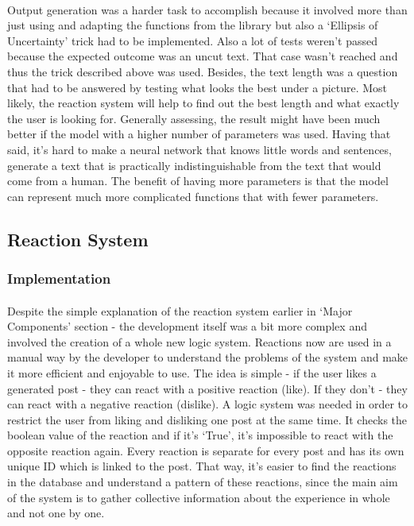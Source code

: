 \documentclass[12pt]{report}
\begin{document}
\paragraph{}
Output generation was a harder task to accomplish because it involved more than just using and adapting the functions
from the library but also a `Ellipsis of Uncertainty' trick had to be implemented. Also a lot of tests weren't passed
because the expected outcome was an uncut text. That case wasn't reached and thus the trick described above was used.
Besides, the text length was a question that had to be answered by testing what looks the best under a picture. 
Most likely, the reaction system will help to find out the best length and what exactly the user is looking for.
Generally assessing, the result might have been much better if the model with a higher number of parameters was used.
Having that said, it's hard to make a neural network that knows little words and sentences, generate a text that is
practically indistinguishable from the text that would come from a human. The benefit of having more parameters is that
the model can represent much more complicated functions that with fewer parameters.

\clearpage

\subsection*{Reaction System}
\subsubsection*{Implementation}
\paragraph{}
Despite the simple explanation of the reaction system earlier in `Major Components' section - the development
itself was a bit more complex and involved the creation of a whole new logic system. Reactions now are used in a
manual way by the developer to understand the problems of the system and make it more efficient and enjoyable to use.
The idea is simple - if the user likes a generated post - they can react with a positive reaction (like). If they
don't - they can react with a negative reaction (dislike). A logic system was needed in order to restrict the user
from liking and disliking one post at the same time. It checks the boolean value of the reaction and if it's `True',
it's impossible to react with the opposite reaction again. Every reaction is separate for every post and has its own
unique ID which is linked to the post. That way, it's easier to find the reactions in the database and understand a 
pattern of these reactions, since the main aim of the system is to gather collective information about the experience
in whole and not one by one.
\end{document}
